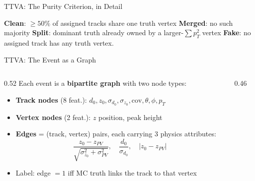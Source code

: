 \documentclass[xcolor=table,aspectratio=169]{beamer}
\begin{document}
\begin{frame}{TTVA: The Purity Criterion, in Detail}
\begin{center}
{}
    \end{center}
    \vspace{-0.3em}
    {\scriptsize \textbf{Clean}: $\geq50\%$ of assigned tracks share one truth vertex \;\textbullet\;
    \textbf{Merged}: no such majority \;\textbullet\;
    \textbf{Split}: dominant truth already owned by a larger-$\sum p_T^2$ vertex \;\textbullet\;
    \textbf{Fake}: no assigned track has any truth vertex.}
\end{frame}

\begin{frame}{TTVA: The Event as a Graph}
    \begin{columns}[c]
        \begin{column}{0.52\linewidth}
            \small
            Each event is a \textbf{bipartite graph} with two node types:
            \begin{itemize}
                \setlength\itemsep{0.35em}
                \item \textcolor{mydarkblue}{\textbf{Track nodes}} (8 feat.): $d_0, z_0, \sigma_{d_0}, \sigma_{z_0}, \mathrm{cov}, \theta, \phi, p_T$
                \item \textcolor{myorange}{\textbf{Vertex nodes}} (2 feat.): $z$ position, peak height
                \item \textbf{Edges} = (track, vertex) pairs, each carrying 3 physics attributes:
                \[
                  \frac{z_0 - z_{PV}}{\sqrt{\sigma_{z_0}^2+\sigma_{PV}^2}},\quad
                  \frac{d_0}{\sigma_{d_0}},\quad |z_0 - z_{PV}|
                \]
                \item Label: edge $=1$ iff MC truth links the track to that vertex
            \end{itemize}
        \end{column}
        \begin{column}{0.46\linewidth}
            \centering
\end{column}
\end{columns}
\end{frame}
\end{document}
